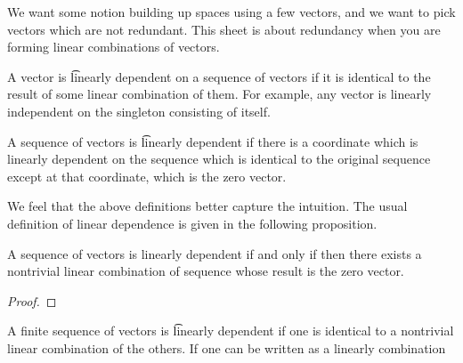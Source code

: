 
\sbasic






























\sstart
{}


We want some notion building up spaces using a few vectors, and we want to pick vectors which are not redundant.
This sheet is about redundancy when you are forming linear combinations of vectors.



A vector is \t{linearly dependent} on a sequence of vectors if it is identical to the result of some linear combination of them.
For example, any vector is linearly independent on the singleton consisting of itself.

A sequence of vectors is \t{linearly dependent} if there is a coordinate which is linearly dependent on the sequence which is identical to the original sequence except at that coordinate, which is the zero vector.

We feel that the above definitions better capture the intuition.
The usual definition of linear dependence is given in the following proposition.
\begin{prop}
  A sequence of vectors is linearly dependent if and only if then there exists a nontrivial linear combination of sequence whose result is the zero vector.
  \begin{proof}

  \end{proof}

\end{prop}
A finite sequence of vectors is \t{linearly dependent} if one is identical to a nontrivial linear combination of the others.
If one can be written as a linearly combination

